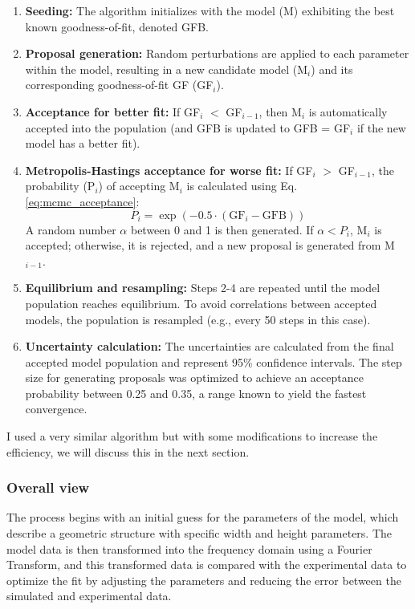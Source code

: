 \begin{enumerate}
    \item \textbf{Seeding:} The algorithm initializes with the model (M) exhibiting the best known goodness-of-fit, denoted GFB.
    \item \textbf{Proposal generation:} Random perturbations are applied to each parameter within the model, resulting in a new candidate model (M$_i$) and its corresponding goodness-of-fit GF (GF$_i$).
    \item \textbf{Acceptance for better fit:} If GF$_i$ $<$ GF$_{i-1}$, then M$_i$ is automatically accepted into the population (and GFB is updated to GFB = GF$_i$ if the new model has a better fit).
    \item \textbf{Metropolis-Hastings acceptance for worse fit:} If GF$_i$ $>$ GF$_{i-1}$, the probability (P$_i$) of accepting M$_i$ is calculated using Eq. \eqref{eq:mcmc_acceptance}:
    \begin{equation}
        P_i = \exp \left( -0.5 \cdot (\text{GF}_i - \text{GFB}) \right) \label{eq:mcmc_acceptance}
    \end{equation}
    A random number $\alpha$ between 0 and 1 is then generated. If $\alpha < P_i$, M$_i$ is accepted; otherwise, it is rejected, and a new proposal is generated from M$_{i-1}$.
    \item \textbf{Equilibrium and resampling:} Steps 2-4 are repeated until the model population reaches equilibrium. To avoid correlations between accepted models, the population is resampled (e.g., every 50 steps in this case).
    \item \textbf{Uncertainty calculation:} The uncertainties are calculated from the final accepted model population and represent 95\% confidence intervals. The step size for generating proposals was optimized to achieve an
     acceptance probability between 0.25 and 0.35, a range known to yield the fastest convergence.
\end{enumerate}

I used a very similar algorithm but with some modifications to increase the efficiency, we will discuss this in the next section.

\subsubsection{Overall view}

\medskip

The process begins with an initial guess for the parameters of the model, which describe a geometric structure with specific width and height parameters. The model data is then transformed into the frequency domain using a Fourier Transform, and this transformed data is compared with the experimental data to optimize the fit by adjusting the parameters and reducing the error between the simulated and experimental data.

